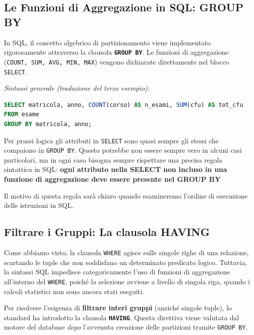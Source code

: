 \subsection{Le Funzioni di Aggregazione in SQL: GROUP BY}

In SQL, il concetto algebrico di partizionamento viene implementato rigorosamente attraverso la clausola \textbf{\texttt{GROUP BY}}. Le funzioni di aggregazione (\texttt{COUNT, SUM, AVG, MIN, MAX}) vengono dichiarate direttamente nel blocco \texttt{SELECT}.

\textit{Sintassi generale (traduzione del terzo esempio):}
\begin{lstlisting}[language=SQL, basicstyle=\ttfamily\small, keywordstyle=\color{blue}\bfseries]
SELECT matricola, anno, COUNT(corso) AS n_esami, SUM(cfu) AS tot_cfu
FROM esame
GROUP BY matricola, anno;
\end{lstlisting}

\begin{warningbox}
Per prassi logica gli attributi in \texttt{SELECT} sono quasi sempre gli stessi che compaiono in \texttt{GROUP BY}. Questo potrebbe non essere sempre vero in alcuni casi particolari, ma in ogni caso bisogna sempre rispettare una precisa regola sintattica in SQL: \textbf{ogni attributo nella SELECT non incluso in una funzione di aggregazione deve essere presente nel GROUP BY}

\medskip

Il motivo di questa regola sarà chiaro quando esamineremo l'ordine di esecuzione delle istruzioni in SQL. 

\end{warningbox}

\subsection{Filtrare i Gruppi: La clausola HAVING}

Come abbiamo visto, la clausola \texttt{WHERE} agisce sulle singole righe di una relazione, scartando le tuple che non soddisfano un determinato predicato logico. Tuttavia, la sintassi SQL impedisce categoricamente l'uso di funzioni di aggregazione all'interno del \texttt{WHERE}, poiché la selezione avviene a livello di singola riga, quando i calcoli statistici non sono ancora stati eseguiti.

Per risolvere l'esigenza di \textbf{filtrare interi gruppi} (anziché singole tuple), lo standard ha introdotto la clausola \textbf{\texttt{HAVING}}. Questa direttiva viene valutata dal motore del database \textit{dopo} l'avvenuta creazione delle partizioni tramite \texttt{GROUP BY}.


